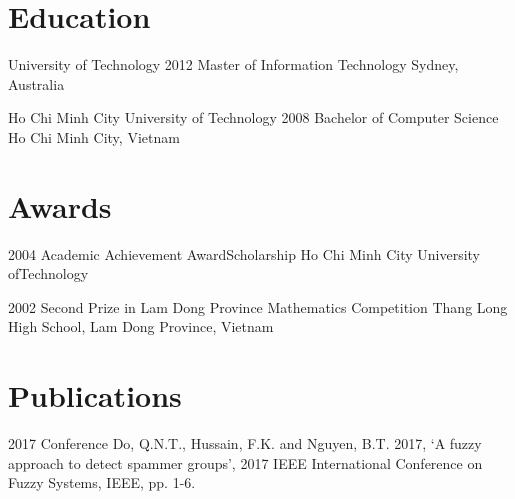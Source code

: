 \documentclass{tccv}
\begin{document}
\section{Education}
\begin{yearlist}

\item[University of Technology]{2012}
    {Master of Information Technology}
    {Sydney, Australia}

\item[Ho Chi Minh City University of Technology]{2008}
    {Bachelor of Computer Science}
    {Ho Chi Minh City, Vietnam}

\end{yearlist}

\section{Awards}

\begin{yearlist}

\item{2004}
    {Academic Achievement Award\newline Scholarship}
    {Ho Chi Minh City University of\newline Technology}

\item{2002}
    {Second Prize in Lam Dong Province Mathematics Competition}
    {Thang Long High School, Lam Dong Province, Vietnam}

\end{yearlist}

\section{Publications}

\begin{yearlist}
\item{2017}
    {Conference}
    {Do, Q.N.T., Hussain, F.K. and Nguyen, B.T. 2017, ‘A fuzzy approach to
        detect spammer groups’, 2017 IEEE International Conference on Fuzzy
    Systems, IEEE, pp. 1-6.}
\end{yearlist}
\end{document}
